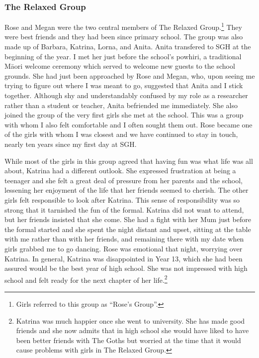 \subsubsection{The Relaxed Group}\label{relaxedgroup}

Rose and Megan were the two central members of The Relaxed Group.\footnote{Girls referred to this group as ``Rose's Group''.}  They were best friends and they had been since primary school. The group was also made up of Barbara, Katrina, Lorna, and Anita. Anita transfered to SGH at the beginning of the year. I met her just before the school's powhiri, a traditional M\=aori welcome ceremony which served to welcome new guests to the school grounds. She had just been approached by Rose and Megan, who, upon seeing me trying to figure out where I was meant to go, suggested that Anita and I stick together. Although shy and understandably confused by my role as a researcher rather than a student or teacher, Anita befriended me immediately. She also joined the group of the very first girls she met at the school. This was a group with whom I also felt comfortable and I often sought them out. Rose became one of the girls with whom I was closest and we have continued to stay in touch, nearly ten years since my first day at SGH.

While most of the girls in this group agreed that having fun was what life was all about, Katrina had a different outlook. She expressed frustration at being a teenager and she felt a great deal of pressure from her parents and the school, lessening her enjoyment of the life that her friends seemed to cherish. The other girls felt responsible to look after Katrina. This sense of responsibility was so strong that it tarnished the fun of the formal. Katrina did not want to attend, but her friends insisted that she come. She had a fight with her Mum just before the formal started and she spent the night distant and upset, sitting at the table with me rather than with her friends, and remaining there with my date when girls grabbed me to go dancing. Rose was emotional that night, worrying over Katrina. In general, Katrina was disappointed in Year 13, which she had been assured would be the best year of high school. She was not impressed with high school and felt ready for the next chapter of her life.\footnote{Katrina was much happier once she went to university. She has made good friends and she now admits that in high school she would have liked to have been better friends with The Goths but worried at the time that it would cause problems with girls in The Relaxed Group.}  

